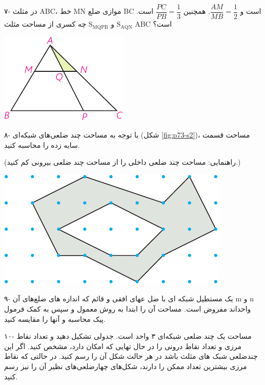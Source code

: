 \documentclass[12pt, a4paper]{book}
\newenvironment{Figure}
{\par\medskip\noindent\minipage{\linewidth}}
{\endminipage\par\medskip}
\begin{document}
\begin{multicols}{2}
{\medium ۷-}
در مثلث ABC، خط MN موازی ضلع BC است و 
$ \dfrac{AM}{MB} = \dfrac{1}{2} $.
همچنین 
$ \dfrac{PC}{PB} = \dfrac{1}{3} $
است. 
$ \mathrm{S}_{\mathrm{AQN}} $ و $\mathrm{S}_{\mathrm{MQPB}}$
چه کسری از مساحت مثلث ABC است؟

\begin{Figure}
	\centering
	\includegraphics[scale=1.2]{"Shapes/Fasl - 3/Dars 2/P73-S1.pdf"}
\end{Figure}

\bigskip
{\medium ۸-}
با توجه به مساحت چند ضلعی‌های شبکه‌ای
 (شکل \ref{fig:p73-s2})،
  مساحت قسمت سایه زده را محاسبه کنید.
{{\small (راهنمایی: مساحت چند ضلعی داخلی را از مساحت چند ضلعی بیرونی کم کنید.)}

\begin{Figure}
	\centering
	\includegraphics[width=0.9\linewidth]{"Shapes/Fasl - 3/Dars 2/P73-S2.pdf"}
	\label{fig:p73-s2}
\end{Figure}

\bigskip
{\medium ۹-}
یک مستطیل شبکه ای با ضل عهای افقی و قائم که اندازه های ضلع‌های آن m و n واحداند مفروض است. مساحت آن را ابتدا به روش معمول و سپس به کمک فرمول پیک محاسبه و آنها را مقایسه کنید.

\bigskip
{\medium ۱۰-}
مساحت یک چند ضلعی شبکه‌ای ۳ واحد است. جدولی تشکیل دهید و تعداد نقاط مرزی و تعداد نقاط درونی را در حال تهایی که امکان دارد، مشخص کنید. اگر این چندضلعی شبک های مثلث باشد در هر حالت شکل آن را رسم کنید. در حالتی که نقاط مرزی بیشترین تعداد ممکن را دارند، شکل‌های چهارضلعی‌های نظیر آن را نیز رسم کنید.

}\end{multicols}
\end{document}
